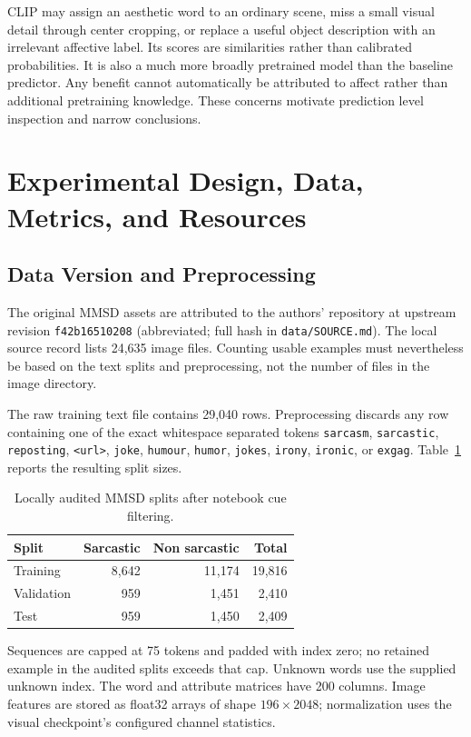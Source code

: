\documentclass[conference]{IEEEtran}
\begin{document}
CLIP may assign an aesthetic word to an ordinary scene, miss a small visual detail through center cropping, or replace a useful object description with an irrelevant affective label. Its scores are similarities rather than calibrated probabilities. It is also a much more broadly pretrained model than the baseline predictor. Any benefit cannot automatically be attributed to affect rather than additional pretraining knowledge. These concerns motivate prediction level inspection and narrow conclusions.

\section{Experimental Design, Data, Metrics, and Resources}
\subsection{Data Version and Preprocessing}
The original MMSD assets are attributed to the authors' repository at upstream revision \texttt{f42b16510208} (abbreviated; full hash in \texttt{data/SOURCE.md}). The local source record lists 24,635 image files. Counting usable examples must nevertheless be based on the text splits and preprocessing, not the number of files in the image directory.

The raw training text file contains 29,040 rows. Preprocessing discards any row containing one of the exact whitespace separated tokens \texttt{sarcasm}, \texttt{sarcastic}, \texttt{reposting}, \texttt{<url>}, \texttt{joke}, \texttt{humour}, \texttt{humor}, \texttt{jokes}, \texttt{irony}, \texttt{ironic}, or \texttt{exgag}. Table~\ref{tab:data} reports the resulting split sizes.

\begin{table}[t]
\caption{Locally audited MMSD splits after notebook cue filtering.}
\label{tab:data}
\centering
\begin{tabular}{lrrr}
\hline
Split & Sarcastic & Non sarcastic & Total\\
\hline
Training & 8,642 & 11,174 & 19,816\\
Validation & 959 & 1,451 & 2,410\\
Test & 959 & 1,450 & 2,409\\
\hline
\end{tabular}
\end{table}

Sequences are capped at 75 tokens and padded with index zero; no retained example in the audited splits exceeds that cap. Unknown words use the supplied unknown index. The word and attribute matrices have 200 columns. Image features are stored as float32 arrays of shape $196\times2048$; normalization uses the visual checkpoint's configured channel statistics.
\end{document}
